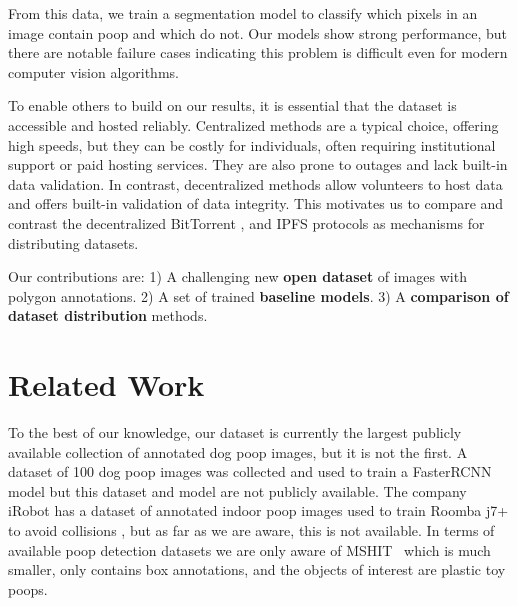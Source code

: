 \documentclass{article}
\begin{document}
From this data, we train a segmentation model to classify which pixels in an image contain poop and which do
  not.
Our models show strong performance, but there are notable failure cases indicating this problem is difficult
  even for modern computer vision algorithms.

To enable others to build on our results, it is essential that the dataset is accessible and hosted
  reliably.
Centralized methods are a typical choice, offering high speeds, but they can be costly for individuals,
  often requiring institutional support or paid hosting services.
They are also prone to outages and lack built-in data validation.
In contrast, decentralized methods allow volunteers to host data and offers built-in validation of data
  integrity.
This motivates us to compare and contrast the decentralized BitTorrent \cite{cohen_incentives_2003}, and
  IPFS \cite{benet_ipfs_2014} protocols as mechanisms for distributing datasets.


Our contributions are:
1) A challenging new \textbf{open dataset} of images with polygon annotations.
2) A set of trained \textbf{baseline models}.
3) A \textbf{comparison of dataset distribution} methods.



\section{Related Work}
\label{sec:relatedwork}

To the best of our knowledge, our dataset is currently the largest publicly available collection of
  annotated dog poop images, but it is not the first.
A dataset of 100 dog poop images was collected and used to train a FasterRCNN model
  \cite{neeraj_madan_dog_2019} but this dataset and model are not publicly available.
The company iRobot has a dataset of annotated indoor poop images used to train Roomba j7+ to avoid
  collisions \cite{roomba_2021}, but as far as we are aware, this is not available.
In terms of available poop detection datasets we are only aware of MSHIT~\cite{mshit_2020} which is much
  smaller, only contains box annotations, and the objects of interest are plastic toy poops.
\end{document}
